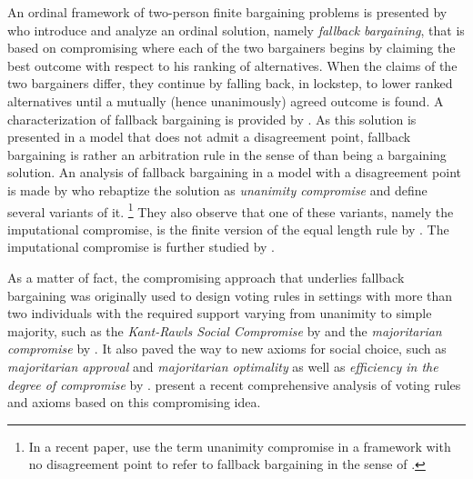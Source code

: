 \documentclass[version=3.21, pagesize, twoside=off, bibliography=totoc, DIV=calc, fontsize=12pt, a4paper]{scrartcl}
\begin{document}
An ordinal framework of two-person finite bargaining problems is presented by \citet{BramsKilgour2001} who introduce and analyze an ordinal solution, namely \textit{fallback bargaining}, that is based on compromising where each of the two bargainers begins by claiming the best outcome with respect to his ranking of alternatives. When the claims of the two bargainers differ, they continue by falling back, in lockstep, to lower ranked alternatives until a mutually (hence unanimously) agreed outcome is found. A characterization of fallback bargaining is provided by \citet{de2012reason}. As this solution is presented in a model that does not admit a disagreement point, fallback bargaining is rather an arbitration rule in the sense of \citet{Sprumont1993} than being a bargaining solution. An analysis of fallback bargaining in a model with a disagreement point is made by \citet{KibrisSertel2007} who rebaptize the solution as \textit{unanimity compromise} and define several variants of it.%
\footnote{In a recent paper, \citet{barbera2022compromising} use the term unanimity compromise in a framework with no disagreement point to refer to fallback bargaining in the sense of \citet{BramsKilgour2001}.}
They also observe that one of these variants, namely the imputational compromise, is the finite version of the equal length rule by \citet{thomson2019equal}. The imputational compromise is further studied by \citet{ConleyWilkie2012}.
 
As a matter of fact, the compromising approach that underlies fallback bargaining was originally used to design voting rules in settings with more than two individuals with the required support varying from unanimity to simple majority, such as the \textit{Kant-Rawls Social Compromise} by \citet{HurwiczSertel1997}  and the \textit{majoritarian compromise} by \citet{sertel1999majoritarian}. It also paved the way to new axioms for social choice, such as \textit{majoritarian approval} and \textit{majoritarian optimality} as well as \textit{efficiency in the degree of compromise} by \citet{ozkal2004efficiency}.
\citet{merlin2019compromise} present a recent comprehensive analysis of voting rules and axioms based on this compromising idea.
\end{document}
